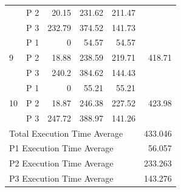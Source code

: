\documentclass[conference]{IEEEtran}
\begin{document}
\begin{table}[]
\begin{tabular}{@{}llrrrr@{}}
                    & P 2     & 20.15                          & 231.62                       & 211.47                                  &                                               \\
                    & P 3     & 232.79                         & 374.52                       & 141.73                                  &                                               \\
\multirow{3}{*}{9}  & P 1     & 0                              & 54.57                        & 54.57                                   & \multirow{3}{*}{418.71}                       \\
                    & P 2     & 18.88                          & 238.59                       & 219.71                                  &                                               \\
                    & P 3     & 240.2                          & 384.62                       & 144.43                                  &                                               \\
\multirow{3}{*}{10} & P 1     & 0                              & 55.21                        & 55.21                                   & \multirow{3}{*}{423.98}                       \\
                    & P 2     & 18.87                          & 246.38                       & 227.52                                  &                                               \\
                    & P 3     & 247.72                         & 388.97                       & 141.26                                  &                                               \\ \bottomrule 
\multicolumn{5}{l}{Total Execution Time Average}                                              & 433.046                                       \\ \bottomrule
\multicolumn{5}{l}{P1 Execution Time Average}                                                 & 56.057                                        \\ \bottomrule
\multicolumn{5}{l}{P2 Execution Time Average}                                                 & 233.263                                       \\ \bottomrule
\multicolumn{5}{l}{P3 Execution Time Average}                                                 & 143.276                                       \\ \bottomrule
\end{tabular}
\end{table}
\end{document}
